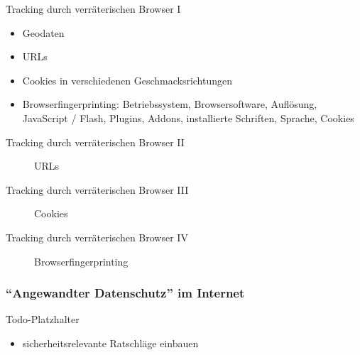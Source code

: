 \documentclass[utf8]{beamer}
\begin{document}
	
	\begin{frame}{Tracking durch verräterischen Browser I}
		\begin{itemize}
			\item Geodaten
			\item URLs 
			\item Cookies in verschiedenen Geschmacksrichtungen
			\item Browserfingerprinting: Betriebssystem, Browsersoftware, Auflösung, JavaScript / Flash, Plugins, Addons, installierte Schriften, Sprache, Cookies
		\end{itemize}
	\end{frame}
	
	\begin{frame}{Tracking durch verräterischen Browser II}
		\begin{figure}[V]
			\label{fig:url shortener}
			\caption{URLs}
		\end{figure}
	\end{frame}

	\begin{frame}{Tracking durch verräterischen Browser III}
		\begin{figure}[V]
			\label{fig:lightbeam}
			\caption{Cookies}
		\end{figure}
	\end{frame}

	\begin{frame}{Tracking durch verräterischen Browser IV}
		\begin{figure}[V]
			\label{fig:panopticlick}
			\caption{Browserfingerprinting}
		\end{figure}
	\end{frame}
	
	\subsubsection{\enquote{Angewandter Datenschutz} im Internet}
	
		\begin{frame}{Todo-Platzhalter}
			\begin{itemize}
				\item sicherheitsrelevante Ratschläge einbauen

			\end{itemize}
		\end{frame}
	
\end{document}
